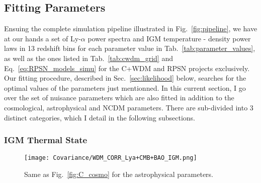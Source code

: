 \subsection{Fitting Parameters}

Ensuing the complete simulation pipeline illustrated in Fig.~\ref{fig:pipeline}, we have at our hands a set of Ly-$\alpha$ power spectra and IGM temperature - density power laws in 13 redshift bins for each parameter value in Tab.~\ref{tab:parameter_values}, as well as the ones listed in Tab.~\ref{tab:cwdm_grid} and Eq.~\ref{eq:RPSN_models_simu} for the C+WDM and RPSN projects exclusively. Our fitting procedure, described in Sec.~\ref{sec:likelihood} below, searches for the optimal values of the parameters just mentionned. In this current section, I go over the set of nuisance parameters which are also fitted in addition to the cosmological, astrophysical and NCDM parameters. There are sub-divided into 3 distinct categories, which I detail in the following subsections.

\subsubsection{IGM Thermal State}
\label{sec:fit_igm}

\begin{figure}
\begin{center}
\texttt{[image: Covariance/WDM\_CORR\_Lya+CMB+BAO\_IGM.png]}
\caption{Same as Fig.~\ref{fig:C_cosmo} for the astrophysical parameters.}
\label{fig:C_astro}
\end{center}
\end{figure}

